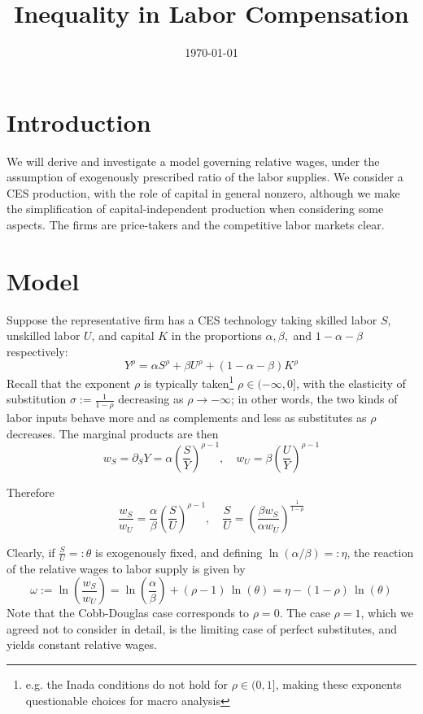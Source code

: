\documentclass{homework}
\date{\today}
\title{Inequality in Labor Compensation}
\begin{document}
 \maketitle

\section{Introduction}

We will derive and investigate a model governing relative wages, under the assumption of exogenously prescribed ratio of the labor supplies. We consider a CES production, with the role of capital in general nonzero, although we make the simplification of capital-independent production when considering some aspects. The firms are price-takers and the competitive labor markets clear.

\section{Model}

Suppose the representative firm has a CES technology taking skilled labor $S$, unskilled labor $U$, and capital $K$ in the proportions $\alpha, \beta,$ and $1-\alpha-\beta$ respectively: \[Y^\rho = \alpha S^\rho + \beta U^\rho +  (1-\alpha-\beta)K^\rho\]
Recall that the exponent $\rho$ is typically taken\footnote{e.g. the Inada conditions do not hold for $\rho\in(0,1]$, making these exponents questionable choices for macro analysis} $\rho\in(-\infty,0]$, with the elasticity of substitution $\sigma :=\frac{1}{1-\rho}$ decreasing as $\rho \to -\infty$; in other words, the two kinds of labor inputs behave more and as complements and less as substitutes as $\rho$ decreases.
The marginal products are then \[w_S = \partial_S Y = \alpha\left(\frac{S}{Y}\right)^{\rho-1}, \quad w_U = \beta\left(\frac{U}{Y}\right)^{\rho-1} \]

Therefore
\[\frac{w_S}{w_U} = \frac{\alpha}{\beta}\left(\frac{S}{U}\right)^{\rho-1}, \quad \frac{S}{U} = \left(\frac{\beta w_S}{\alpha w_U}\right)^{\frac{1}{1-\rho}}\]

Clearly, if $\frac{S}{U} =: \theta$ is exogenously fixed, and defining $\ln(\alpha/\beta) =: \eta$, the reaction of the relative wages to labor supply is given by \[\omega := \ln\left(\frac{w_S}{w_U}\right) = \ln\left(\frac{\alpha}{\beta}\right) + (\rho-1)\,\ln(\theta) = \eta - (1-\rho)\,\ln(\theta)\]
Note that the Cobb-Douglas case corresponds to $\rho=0$. The case $\rho = 1$, which we agreed not to consider in detail, is the limiting case of perfect substitutes, and yields constant relative wages.
\end{document}
